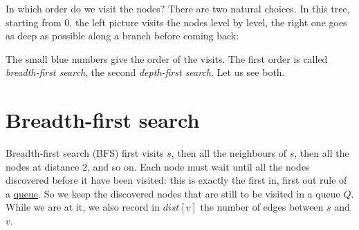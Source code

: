 \documentclass[a4paper,12pt,oneside]{report}
\begin{document}
In which order do we visit the nodes? There are two natural choices.
In this tree, starting from $0$, the left picture visits the nodes
level by level, the right one goes as deep as possible along a branch
before coming back:
\begin{center}
\end{center}
The small blue numbers give the order of the visits. The first order
is called \emph{breadth-first search}, the second \emph{depth-first
search}. Let us see both.

\section{Breadth-first search}
\label{sec:bfs}

Breadth-first search (BFS) first visits $s$, then all the neighbours
of $s$, then all the nodes at distance $2$, and so on. Each node must
wait until all the nodes discovered before it have been visited: this
is exactly the first in, first out rule of a
\hyperref[def:queue-adt]{queue}. So we keep the discovered nodes that
are still to be visited in a queue $Q$. While we are at it, we also
record in $\mathit{dist}[v]$ the number of edges between $s$ and $v$.
\end{document}

